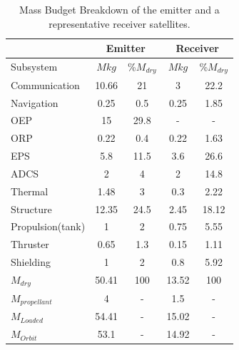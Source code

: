 \begin{table}[ht!]
\centering
\begin{tabular}{|l|c|c|c|c|}
\hline
 & \multicolumn{2}{|c|}{Emitter} & \multicolumn{2}{|c|}{Receiver} \\\hline
 Subsystem        & $M kg$ & \%$M_{dry}$ & $M kg$ & \%$M_{dry}$ \\\hline\hline
 Communication    & 10.66    & 21          & 3        & 22.2 \\\hline
 Navigation       & 0.25     & 0.5         & 0.25     & 1.85 \\\hline
 OEP              & 15       & 29.8        & -        & - \\\hline
 ORP              & 0.22     & 0.4         & 0.22     & 1.63 \\\hline
 EPS              & 5.8      & 11.5        & 3.6      & 26.6 \\\hline
 ADCS             & 2        & 4           & 2        & 14.8 \\\hline
 Thermal          & 1.48     & 3           & 0.3      & 2.22 \\\hline
 Structure        & 12.35    & 24.5        & 2.45     & 18.12 \\\hline
 Propulsion(tank) & 1        & 2           & 0.75     & 5.55 \\\hline
 Thruster         & 0.65     & 1.3         & 0.15     & 1.11 \\\hline
 Shielding        & 1        & 2           & 0.8      & 5.92 \\\hline\hline
 $M_{dry}$        & 50.41    & 100         & 13.52    & 100 \\\hline
 $M_{propellant}$ & 4        & -           & 1.5      & - \\\hline
 $M_{Loaded}$     & 54.41    & -           & 15.02    & - \\\hline
 $M_{Orbit}$      & 53.1     & -           & 14.92    & - \\\hline
\end{tabular}
\caption{Mass Budget Breakdown of the emitter and a representative receiver satellites.}
\label{tab:MB}
\end{table}

